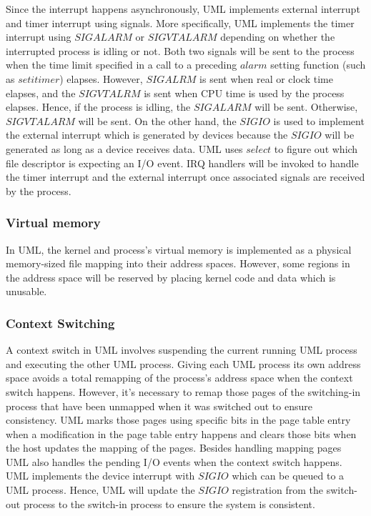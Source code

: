 Since the interrupt happens asynchronously, UML implements external interrupt and timer interrupt using signals. More specifically, UML implements the timer interrupt using $SIGALARM$ or $SIGVTALARM$ depending on whether the interrupted process is idling or not. Both two signals will be sent to the process when the time limit specified in a call to a preceding $alarm$ setting function (such as $setitimer$) elapses. However, $SIGALRM$ is sent when real or clock time elapses, and the $SIGVTALRM$ is sent when CPU time is used by the process elapses. Hence, if the process is idling, the $SIGALARM$ will be sent. Otherwise, $SIGVTALARM$ will be sent. On the other hand, the $SIGIO$ is used to implement the external interrupt which is generated by devices because the $SIGIO$ will be generated as long as a device receives data. UML uses $select$ to figure out which file descriptor is expecting an I/O event. IRQ handlers will be invoked to handle the timer interrupt and the external interrupt once associated signals are received by the process.

\subsubsection{Virtual memory}

In UML, the kernel and process's virtual memory is implemented as a physical memory-sized file mapping into their address spaces. However, some regions in the address space will be reserved by placing kernel code and data which is unusable.

\subsubsection{Context Switching}


A context switch in UML involves suspending the current running UML process and executing the other UML process. Giving each UML process its own address space avoids a total remapping of the process's address space when the context switch happens. However, it's necessary to remap those pages of the switching-in process that have been unmapped when it was switched out to ensure consistency. UML marks those pages using specific bits in the page table entry when a modification in the page table entry happens and clears those bits when the host updates the mapping of the pages. Besides handling mapping pages UML also handles the pending I/O events when the context switch happens. UML implements the device interrupt with $SIGIO$ which can be queued to a UML process. Hence, UML will update the $SIGIO$ registration from the switch-out process to the switch-in process to ensure the system is consistent.        

